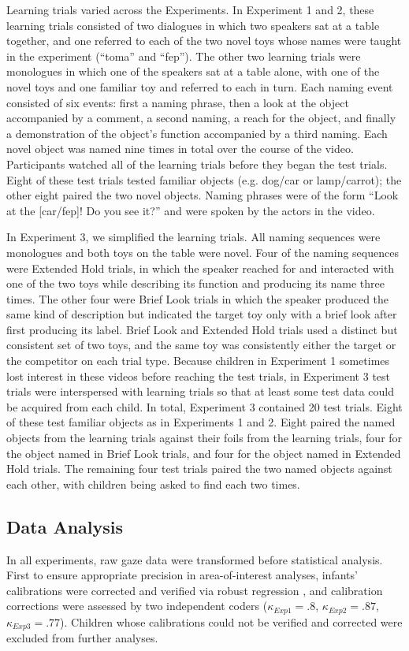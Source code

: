 \documentclass[man,floatsintext]{apa6}
\begin{document}
Learning trials varied across the Experiments. In Experiment 1 and 2, these learning trials consisted of two dialogues in which two speakers sat at a table together, and one referred to each of the two novel toys whose names were taught in the experiment (``toma'' and ``fep''). The other two learning trials were monologues in which one of the speakers sat at a table alone, with one of the novel toys and one familiar toy and referred to each in turn. Each naming event consisted of six events: first a naming phrase, then a look at the object accompanied by a comment, a second naming, a reach for the object, and finally a demonstration of the object's function accompanied by a third naming. Each novel object was named nine times in total over the course of the video. Participants watched all of the learning trials before they began the test trials. Eight of these test trials tested familiar objects (e.g. dog/car or lamp/carrot); the other eight paired the two novel objects. Naming phrases were of the form ``Look at the [car/fep]! Do you see it?'' and were spoken by the actors in the video.

In Experiment 3, we simplified the learning trials. All naming sequences were monologues and both toys on the table were novel.  Four of the naming sequences were Extended Hold trials, in which the speaker reached for and interacted with one of the two toys while describing its function and producing its name three times. The other four were Brief Look trials in which the speaker produced the same kind of description but indicated the target toy only with a brief look after first producing its label. Brief Look and Extended Hold trials used a distinct but consistent set of two toys, and the same toy was consistently either the target or the competitor on each trial type. Because children in Experiment 1 sometimes lost interest in these videos before reaching the test trials, in Experiment 3 test trials were interspersed with learning trials so that at least some test data could be acquired from each child. In total, Experiment 3 contained 20 test trials. Eight of these test familiar objects as in Experiments 1 and 2. Eight paired the named objects from the learning trials against their foils from the learning trials, four for the object named in Brief Look trials, and four for the object named in Extended Hold trials. The remaining four test trials paired the two named objects against each other, with children being asked to find each two times.

\setlength{\parskip}{1em}
\subsection{Data Analysis} In all experiments, raw gaze data were transformed before statistical analysis. First to ensure appropriate precision in area-of-interest analyses, infants' calibrations were corrected and verified via robust regression \cite<described in>{frank2012}, and calibration corrections were assessed by two independent coders ({\small$\kappa_{Exp1} = .8$}, {\small$\kappa_{Exp2} = .87$}, {\small$\kappa_{Exp3} = .77$}). Children whose calibrations could not be verified and corrected were excluded from further analyses.
\end{document}
